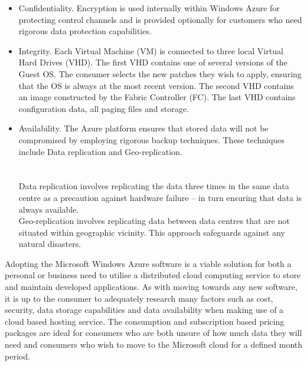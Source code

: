 \begin{itemize}
\item Confidentiality. Encryption is used internally within Windows Azure for protecting control channels and is provided optionally for customers who need rigorous data protection capabilities. 

\item Integrity. Each Virtual Machine (VM) is connected to three local Virtual Hard Drives (VHD). The first VHD contains one of several versions of the Guest OS. The consumer selects the new patches they wish to apply, ensuring that the OS is always at the most recent version. The second VHD contains an image constructed by the Fabric Controller (FC). The last VHD contains configuration data, all paging files and storage. 

\item Availability. The Azure platform ensures that stored data will not be compromised by employing rigorous backup techniques. These techniques include Data replication and Geo-replication.\ftAfour\ftAfourText \\ 
\\
\\ %

Data replication involves replicating the data three times in the same data centre as a precaution against hardware failure – in turn ensuring that data is always available. \\

Geo-replication involves replicating data between data centres that are not situated within geographic vicinity. This approach safeguards against any natural disasters.
\end{itemize}


Adopting the Microsoft Windows Azure software is a viable solution for both a personal or business need to utilise a distributed cloud computing service to store and maintain developed applications. As with moving towards any new software, it is up to the consumer to adequately research many factors such as cost, security, data storage capabilities and data availability when making use of a cloud based hosting service. The consumption and subscription based pricing packages are ideal for consumers who are both unsure of how much data they will need and consumers who wish to move to the Microsoft cloud for a defined month period.